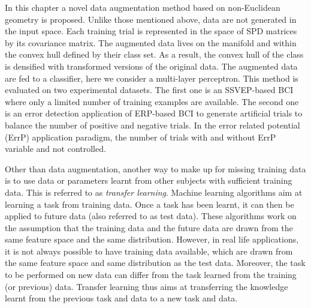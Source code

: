 In this chapter a novel data augmentation method based on non-Euclidean geometry is proposed. 
Unlike those mentioned above, data are not generated in the input space. 
Each training trial is represented in the space of SPD matrices by its covariance matrix. 
The augmented data lives on the manifold and within the convex hull defined by their class set. %
As a result, the convex hull of the class is densified with transformed versions of the original data. 
The augmented data are fed to a classifier, here we consider a multi-layer perceptron. 
This method is evaluated on two experimental datasets.
The first one is an SSVEP-based BCI where only a limited number of training examples are available.
The second one is an error detection application of ERP-based BCI to generate artificial trials to balance the number of positive and negative trials.
In the error related potential (ErrP) application paradigm, the number of trials with and without ErrP variable and not controlled.

Other than data augmentation, another way to make up for missing training data is to use data or parameters learnt from other subjects with sufficient training data. 
This is referred to as \emph{transfer learning}.
Machine learning algorithms aim at learning a task from training data. 
Once a task has been learnt, it can then be applied to future data (also referred to as test data). 
These algorithms work on the assumption that the training data and the future data are drawn from the same feature space and the same distribution.
However, in real life applications, it is not always possible to have training data available, which are drawn from the same feature space and same distribution as the test data. 
Moreover, the task to be performed on new data can differ from the task learned from the training (or previous) data.
Transfer learning thus aims at transferring the knowledge learnt from the previous task and data to a new task and data.


